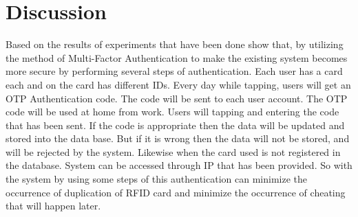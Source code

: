 \section{Discussion}
\label{Discussion}
Based on the results of experiments that have been done show that, by utilizing the method of Multi-Factor Authentication to make the existing system becomes more secure by performing several steps of authentication. Each user has a card each and on the card has different IDs. Every day while tapping, users will get an OTP Authentication code. The code will be sent to each user account. The OTP code will be used at home from work. Users will tapping and entering the code that has been sent. If the code is appropriate then the data will be updated and stored into the data base. But if it is wrong then the data will not be stored, and will be rejected by the system. Likewise when the card used is not registered in the database. System can be accessed through IP that has been provided. So with the system by using some steps of this authentication can minimize the occurrence of duplication of RFID card and minimize the occurrence of cheating that will happen later.